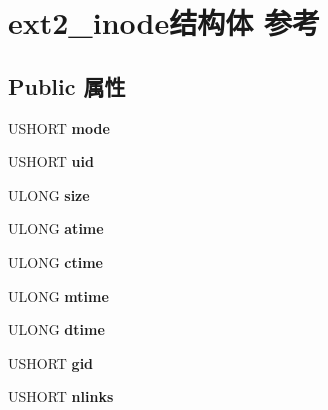 \hypertarget{structext2__inode}{}\section{ext2\+\_\+inode结构体 参考}
\label{structext2__inode}
\subsection*{Public 属性}
\begin{DoxyCompactItemize}
\item 
\mbox{\label{structext2__inode_ab993e615655e7ccd3507c3e7efcf3833}} 
U\+S\+H\+O\+RT {\bfseries mode}
\item 
\mbox{\label{structext2__inode_aeb2402f0382993f3008738504243f8d4}} 
U\+S\+H\+O\+RT {\bfseries uid}
\item 
\mbox{\label{structext2__inode_a205a019dd3afd901bc2e53fda2782d14}} 
U\+L\+O\+NG {\bfseries size}
\item 
\mbox{\label{structext2__inode_afb7111856518b799dd24fd6432a28c6f}} 
U\+L\+O\+NG {\bfseries atime}
\item 
\mbox{\label{structext2__inode_a169243ed317b1f158c025943568b370f}} 
U\+L\+O\+NG {\bfseries ctime}
\item 
\mbox{\label{structext2__inode_a82c8a01da4f03e01eca2dbdaa7d93b98}} 
U\+L\+O\+NG {\bfseries mtime}
\item 
\mbox{\label{structext2__inode_afec6b255f52b4840a0de2255e5b470f2}} 
U\+L\+O\+NG {\bfseries dtime}
\item 
\mbox{\label{structext2__inode_a88c804ccbd8b1c275f5914c5a7c73d1d}} 
U\+S\+H\+O\+RT {\bfseries gid}
\item 
\mbox{\label{structext2__inode_a3a47d75d4042598e55171636c645a3b0}} 
U\+S\+H\+O\+RT {\bfseries nlinks}
\item 
\mbox{\label{structext2__inode_ac9aaa6f5abc445107acec1da2585e52c}} 

\end{DoxyCompactItemize}
